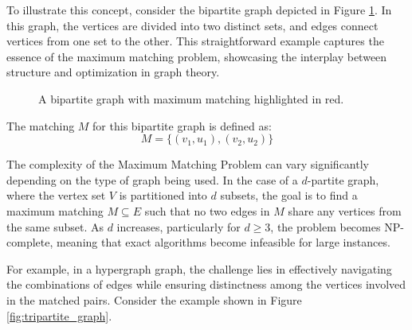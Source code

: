 To illustrate this concept, consider the bipartite graph depicted in Figure \ref{fig:max_match_bipartite_graph}. In this graph, the vertices are divided into two distinct sets, and edges connect vertices from one set to the other. This straightforward example captures the essence of the maximum matching problem, showcasing the interplay between structure and optimization in graph theory.
\newpage

\begin{figure}[ht]
\centering
{}
\caption{A bipartite graph with maximum matching highlighted in red.}
\label{fig:max_match_bipartite_graph}
\end{figure}


The matching \( M \) for this bipartite graph is defined as:
\[
M = \{ (v_1, u_1), (v_2, u_2) \}
\]



The complexity of the Maximum Matching Problem can vary significantly depending on the type of graph being used. In the case of a \(d\)-partite graph, where the vertex set \(V\) is partitioned into \(d\) subsets, the goal is to find a maximum matching \(M \subseteq E\) such that no two edges in \(M\) share any vertices from the same subset. As \(d\) increases, particularly for \(d \geq 3\), the problem becomes NP-complete, meaning that exact algorithms become infeasible for large instances.

For example, in a hypergraph graph, the challenge lies in effectively navigating the combinations of edges while ensuring distinctness among the vertices involved in the matched pairs. Consider the example shown in Figure \ref{fig:tripartite_graph}.

